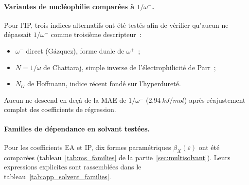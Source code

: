 \paragraph{Variantes de nucléophilie comparées à $1/\omega^-$.}
Pour l'IP, trois indices alternatifs ont été testés afin de vérifier qu'aucun ne dépassait $1/\omega^-$ comme troisième descripteur~:
\begin{itemize}[noitemsep]
\item $\omega^-$ direct (Gázquez), forme duale de $\omega^+$~;
\item $N = 1/\omega$ de Chattaraj\cite{chattaraj2009}, simple inverse de l'électrophilicité de Parr~;
\item $N_G$ de Hoffmann\cite{hoffmann2024}, indice récent fondé sur l'hyperdureté.
\end{itemize}
Aucun ne descend en deçà de la MAE de $1/\omega^-$ ($\SI{2.94}{kJ/mol}$) après réajustement complet des coefficients de régression.

\paragraph{Familles de dépendance en solvant testées.}
Pour les coefficients EA et IP, dix formes paramétriques $\beta_X(\varepsilon)$ ont été comparées (tableau~\ref{tab:ms_families} de la partie~\ref{sec:multisolvant}). Leurs expressions explicites sont rassemblées dans le tableau~\ref{tab:app_solvent_families}.

